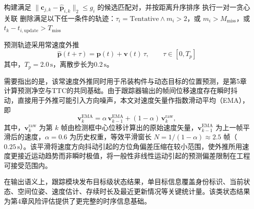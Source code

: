\begin{algorithm}[H]
\caption{短时目标跟踪生命周期更新（单帧）}
\label{alg:ch3_tracker_lifecycle}
构建满足 $\|\mathbf{c}_{j,k}-\hat{\mathbf{p}}_{i,k}\|_2\le g_i$ 的候选匹配对，并按距离升序排序\;
执行一对一贪心关联\;
删除满足以下任一条件的轨迹：$\tau_i=\mathrm{Tentative}\land m_i>2$，或 $m_i>M_{\mathrm{miss}}$，或 $t_k-t_{i,\mathrm{update}}>T_{\mathrm{miss}}$\;
\end{algorithm}

预测轨迹采用常速度外推
\begin{equation}
\hat{\mathbf{p}}(t+\tau)=\mathbf{p}(t)+\mathbf{v}(t)\,\tau,
\qquad
\tau\in[0,T_p]
\end{equation}
其中，$T_p=2.0\,\mathrm{s}$，离散步长为$0.2\,\mathrm{s}$。

需要指出的是，该常速度外推同时用于吊装构件与动态目标的位置预测，是第5章计算预测净空与TTC的共同基础。由于跟踪器输出的帧间位移速度存在瞬时抖动，直接用于外推可能引入方向噪声，本文对速度矢量作指数滑动平均（EMA），即
\begin{equation}
\mathbf{v}_{k}^{\mathrm{EMA}} = \alpha\,\mathbf{v}_{k-1}^{\mathrm{EMA}} + (1-\alpha)\,\mathbf{v}_{k}^{\mathrm{raw}},
\label{eq:ema-velocity}
\end{equation}
其中，$\mathbf{v}_{k}^{\mathrm{raw}}$ 为第 $k$ 帧由检测框中心位移计算出的原始速度矢量，$\mathbf{v}_{k-1}^{\mathrm{EMA}}$ 为上一帧平滑后的速度，$\alpha = 0.6$ 为历史权重，等效平滑窗长 $N = 1/(1-\alpha) \approx 2.5$ 帧（$0.25\,\mathrm{s}$）。该平滑将速度方向抖动引起的方位角偏差压缩在较小范围，使外推所用速度更接近运动趋势而非瞬时极值，将一般性非线性运动引起的预测偏差限制在工程可接受范围内。

在输出语义上，跟踪模块发布目标级状态结果，单目标信息覆盖身份标识、当前状态、空间位姿、速度估计、存续时长及最近更新情况等关键统计量。该类状态结果为第4章风险评估提供了更完整的时序信息基础。


